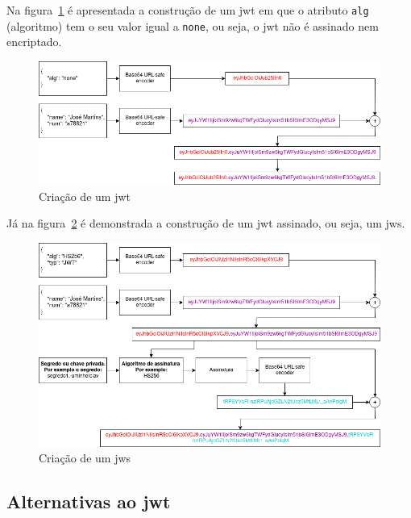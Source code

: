Na figura~\ref{fig:buildJWT} é apresentada a construção de um \acrshort{jwt} em que o atributo \texttt{alg} (algoritmo) tem o seu valor igual a \texttt{none}, ou seja, o \acrshort{jwt} não é assinado nem encriptado.

\begin{figure}[H]
    \begin{center}
        \includegraphics[width=1\textwidth]{img/buildJWT.png}
    \end{center}
    \caption{Criação de um \acrshort{jwt}}\label{fig:buildJWT}
\end{figure}

Já na figura~\ref{fig:buildJWS} é demonstrada a construção de um \acrshort{jwt} assinado, ou seja, um \acrshort{jws}.

\begin{figure}[H]
    \begin{center}
        \includegraphics[width=1\textwidth]{img/buildJWS.png}
    \end{center}
    \caption{Criação de um \acrshort{jws}}\label{fig:buildJWS}
\end{figure}

\subsection{Alternativas ao \acrshort{jwt}}

